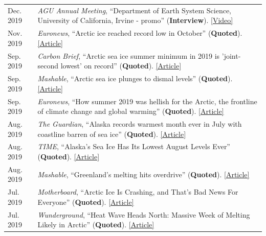 \documentclass[margin,line,palatino,courier,10pt]{res}
\begin{document}
\begin{resume}
\begin{tabular}{@{}p{0.9in}p{4in}}
\end{tabular}
\begin{tabular}{@{}p{0.9in}p{4in}}
Dec. 2019 & \textit{AGU Annual Meeting}, ``Department of Earth System Science, University of California, Irvine - promo'' (\textbf{Interview}). \href{https://www.youtube.com/watch?v=QSDRbSkJeqg&feature=youtu.be}{[Video]}\\
Nov. 2019 & \textit{Euronews}, ``Arctic ice reached record low in October'' (\textbf{Quoted}). \href{https://www.euronews.com/2019/11/04/arctic-ice-reached-record-low-in-october}{[Article]}\\
Sep. 2019 & \textit{Carbon Brief}, ``Arctic sea ice summer minimum in 2019 is 'joint-second lowest' on record'' (\textbf{Quoted}). \href{https://www.carbonbrief.org/arctic-sea-ice-minimum-in-2019-is-joint-second-lowest-on-record}{[Article]}\\
Sep. 2019 & \textit{Mashable}, ``Arctic sea ice plunges to dismal levels'' (\textbf{Quoted}). \href{https://mashable.com/article/arctic-sea-ice-2019-melt/}{[Article]}\\
Sep. 2019 & \textit{Euronews}, ``How summer 2019 was hellish for the Arctic, the frontline of climate change and global warming'' (\textbf{Quoted}). \href{https://www.euronews.com/2019/09/18/how-2019-was-hellish-for-the-arctic-the-frontline-of-climate-change-and-global-warming}{[Article]}\\
Aug. 2019 & \textit{The Guardian}, ``Alaska records warmest month ever in July with coastline barren of sea ice'' (\textbf{Quoted}). \href{https://www.theguardian.com/us-news/2019/aug/08/alaska-warmest-month-ever-july-2019-sea-ice}{[Article]}\\
Aug. 2019 & \textit{TIME}, ``Alaska's Sea Ice Has Its Lowest August Levels Ever'' (\textbf{Quoted}). \href{https://time.com/5646168/alaska-sea-ice-melted/}{[Article]}\\
Aug. 2019 & \textit{Mashable}, ``Greenland's melting hits overdrive'' (\textbf{Quoted}). \href{https://mashable.com/article/greenland-melting-spike-climate-change/}{[Article]}\\
Jul. 2019 & \textit{Motherboard}, ``Arctic Ice Is Crashing, and That's Bad News For Everyone'' (\textbf{Quoted}). \href{https://www.vice.com/en_us/article/qv7gzm/arctic-ice-is-crashing-and-thats-bad-news-for-everyone}{[Article]}\\
Jul. 2019 & \textit{Wunderground}, ``Heat Wave Heads North: Massive Week of Melting Likely in Arctic'' (\textbf{Quoted}). \href{https://www.wunderground.com/cat6/Heat-Wave-Heads-North-Massive-Week-Melting-Likely-Arctic}{[Article]}\\

\end{tabular}
\end{resume}
\end{document}
